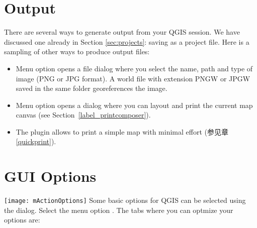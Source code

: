 \section{Output}\label{sec:output}

There are several ways to generate output from your QGIS session. We have
discussed one already in Section \ref{sec:projects}: saving as a project file.
Here is a sampling of other ways to produce output files:

\begin{itemize}
\item Menu option  opens
a file dialog where you select the name, path and type of image (PNG or JPG
format). A world file with extension PNGW or JPGW saved in the same folder
georeferences the image.
\item Menu option  opens a
dialog where you can layout and print the current map canvas (see
Section~\ref{label_printcomposer}).
\item The  plugin allows
to print a simple map with minimal effort (参见章 \ref{quickprint}).
\end{itemize}

\section{GUI Options}\label{subsec:gui_options}

\texttt{[image: mActionOptions]} Some basic options
for QGIS can be selected using the  dialog. Select the
menu option  \arrow
{}. The tabs where you can
optmize your options are:



